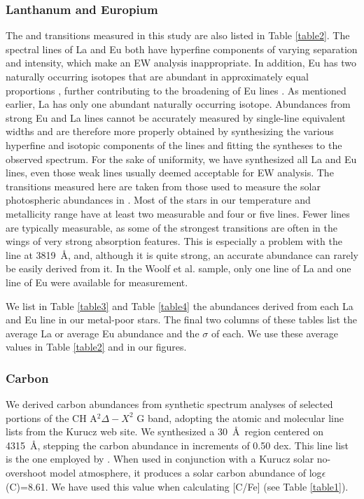 \documentclass[12pt,preprint]{aastex}
\begin{document}
\subsubsection{Lanthanum and Europium}
The  and  transitions measured in this study are also listed in Table \ref{table2}.  The spectral lines of La and Eu both have hyperfine components of varying separation and intensity, which make an EW analysis inappropriate.  In addition, Eu has two naturally occurring isotopes that are abundant in approximately equal proportions \citep{Lodders2003}, further contributing to the broadening of Eu lines \citep{LawlerEu,Sneden2002,Aoki2003}.  As mentioned earlier, La has only one abundant  naturally occurring isotope.  Abundances from strong Eu and La lines cannot be accurately measured by single-line equivalent widths and are therefore more properly obtained by synthesizing the various hyperfine and isotopic components of the lines and fitting the syntheses to the observed spectrum.   For the sake of uniformity, we have synthesized all La and Eu lines, even those weak lines usually deemed acceptable for EW analysis.  The transitions measured here are taken from those used to measure the solar photospheric abundances in \citet{LawlerLa, LawlerEu}.  Most of the stars in our temperature and metallicity range have at least two measurable  and four or five  lines.  Fewer  lines are typically measurable, as some of the strongest  transitions are often in the wings of very strong absorption features.  This is especially a problem with the  line at 3819~\AA,  and, although it is quite strong, an accurate abundance can rarely be easily derived from it.  In the Woolf et al. sample, only one line of La and one line of Eu were available for measurement.

We list in Table \ref{table3} and Table \ref{table4} the abundances derived from each La and Eu line in our metal-poor stars.  The final two columns of these tables list the average La or average Eu abundance and the $\sigma$ of each.  We use these average values in Table \ref{table2} and in our figures.  

\subsubsection{Carbon}
We derived carbon abundances from synthetic spectrum analyses of selected portions of the CH A$^2 \Delta - X^2$ G band, adopting the atomic and molecular line lists from the Kurucz web site.  We synthesized a 30~\AA~region centered on 4315~\AA, stepping the carbon abundance in increments of 0.50 dex.  This line list is the one employed by \citet{Westin2000}.  When used in conjunction with a Kurucz solar no-overshoot model atmosphere, it produces a solar carbon abundance of log$\epsilon $(C)=8.61.  We have used this value when calculating [C/Fe] (see Table \ref{table1}).   
\end{document}
